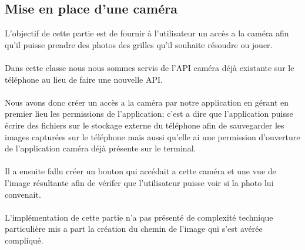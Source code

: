 \documentclass{article}
\begin{document}
\subsection{Mise en place d'une caméra}
L'objectif de cette partie  est de fournir à l'utilisateur un accès a la caméra afin qu'il puisse prendre des photos des grilles qu'il souhaite résoudre ou jouer.\\\\
Dans cette classe nous nous sommes servis de l'API caméra déjà existante sur le téléphone au lieu de faire une nouvelle API.\\\\
Nous avons donc créer un accès a la caméra par notre application en gérant en premier lieu les permissions de l'application; c'est a dire que l'application puisse écrire des fichiers sur le stockage externe du téléphone afin de sauvegarder les images capturées sur le téléphone mais aussi qu'elle ai une permission d'ouverture de l'application caméra déjà présente sur le terminal.\\\\
Il a ensuite fallu créer un bouton qui accédait a cette caméra et une vue de l'image résultante afin de vérifer que l'utilisateur puisse voir si la photo lui convenait.\\\\
L'implémentation de cette partie n'a pas présenté de complexité technique particulière mis a part la création du chemin de l'image qui s'est avérée compliqué.
\end{document}
